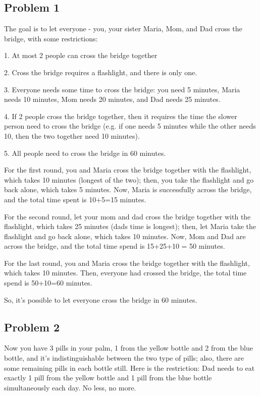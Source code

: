 \documentclass{article}
\begin{document}
\subsection{Problem 1}
The goal is to let everyone - you, your sister Maria, Mom, and Dad cross the bridge, with some restrictions:

1. At most 2 people can cross the bridge together

2. Cross the bridge requires a flashlight, and there is only one.

3. Everyone needs some time to cross the bridge: you need 5 minutes, Maria needs 10 minutes, Mom needs 20 minutes, and Dad needs 25 minutes.

4. If 2 people cross the bridge together, then it requires the time the slower person need to cross the bridge 
(e.g. if one needs 5 minutes while the other needs 10, then the two together need 10 minutes).

5. All people need to cross the bridge in 60 minutes.

For the first round, you and Maria cross the bridge together with the flashlight, which takes 10 minutes (longest of the two); 
then, you take the flashlight and go back alone, which takes 5 minutes. 
Now, Maria is successfully across the bridge, and the total time spent is 10+5=15 minutes.

For the second round, let your mom and dad cross the bridge together with the flashlight, which takes 25 minutes (dads time is longest); 
then, let Maria take the flashlight and go back alone, which takes 10 minutes. Now, Mom and Dad are across the bridge, 
and the total time spend is 15+25+10 = 50 minutes.

For the last round, you and Maria cross the bridge together with the flashlight, which takes 10 minutes. Then, everyone had crossed the bridge, 
the total time spend is 50+10=60 minutes.

So, it's possible to let everyone cross the bridge in 60 minutes.


\hfill

\subsection{Problem 2}
Now you have 3 pills in your palm, 1 from the yellow bottle and 2 from the blue bottle, and it's indistinguishable between the two type of pills; 
also, there are some remaining pills in each bottle still.
Here is the restriction: Dad needs to eat exactly 1 pill from the yellow bottle and 1 pill from the blue bottle simultaneously each day. No less, no more. 
\end{document}
